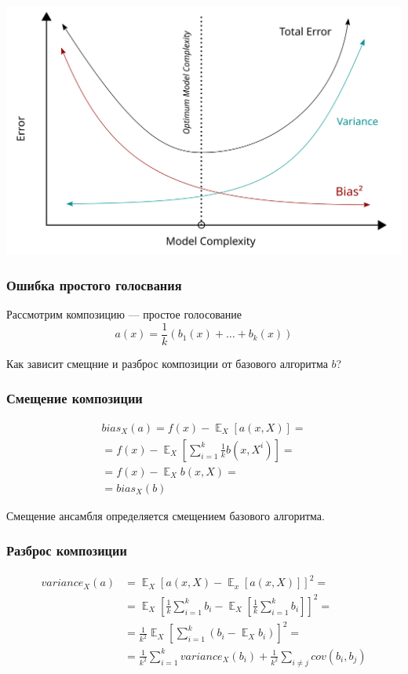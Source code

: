 \documentclass{beamer}
\DeclareMathOperator{\E}{\mathbb{E}}
\begin{document}
	\begin{frame}
		\includegraphics[width=1\textwidth]{img/bias_variance_tradeoff.png}	
	\end{frame}

	\begin{frame}
		\frametitle{Ошибка простого голосвания}

		Рассмотрим композицию --- простое голосование
		\[
		a(x) = \frac{1}{k} \left( b_1(x) + \dots + b_k(x) \right)
		\]

		\vspace{15pt}

		Как зависит смещние и разброс композиции от базового алгоритма $b$?
	\end{frame}

	\begin{frame}
		\frametitle{Смещение композиции}

		\begin{align*}
			bias_X(a) = 
			f(x) - \E_X[a(x, X)] = \\
			= f(x) - \E_X \left[\sum_{i=1}^{k} \frac{1}{k} b(x, X^i) \right] = \\
			= f(x) - \E_X b(x, X) = \\
			= bias_X(b)
		\end{align*}

		Смещение ансамбля определяется смещением базового алгоритма.
	\end{frame}

	\begin{frame}
		\frametitle{Разброс композиции}

		\begin{align*}
			variance_X(a) & = \E_X [ a(x, X) - \E_x[a(x, X)] ]^2 = \\
			& = \E_X \left[ \frac{1}{k} \sum_{i=1}^{k} b_i - \E_X \left[ \frac{1}{k} \sum_{i=1}^{k} b_i \right] \right]^2 = \\
			& = \frac{1}{k^2} \E_X \left[ \sum_{i=1}^{k} \left( b_i - \E_X b_i \right) \right]^2 = \\
			& = \frac{1}{k^2} \sum_{i=1}^{k} variance_X(b_i) + 
			\frac{1}{k^2} \sum_{i \ne j} cov(b_i, b_j)
		\end{align*}
	\end{frame}
\end{document}
